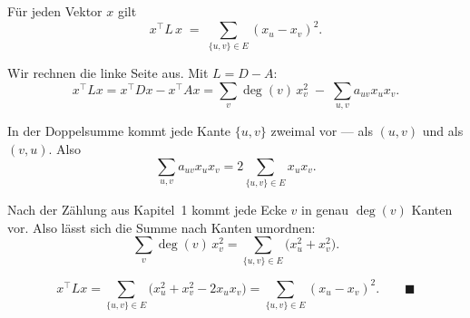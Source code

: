 \begin{merksatz}
Für jeden Vektor $x$ gilt
\[ x^{\!\top} L\, x \;=\; \sum_{\{u,v\} \in E} (x_u - x_v)^2 . \]

Wir rechnen die linke Seite aus. Mit $L = D - A$:
\[ x^{\!\top} L x = x^{\!\top} D x - x^{\!\top} A x = \sum_{v} \deg(v)\, x_v^2 \;-\; \sum_{u,v} a_{uv} x_u x_v . \]

 In der Doppelsumme kommt jede Kante $\{u,v\}$ zweimal vor --- als $(u,v)$ und als $(v,u)$. Also
\[ \sum_{u,v} a_{uv}x_ux_v = 2\sum_{\{u,v\}\in E} x_u x_v . \]

 Nach der Zählung aus Kapitel~1 kommt jede Ecke $v$ in genau $\deg(v)$ Kanten vor. Also lässt sich die Summe nach Kanten umordnen:
\[ \sum_v \deg(v)\,x_v^2 = \sum_{\{u,v\}\in E} \bigl(x_u^2 + x_v^2\bigr) . \]

\[ x^{\!\top}Lx = \sum_{\{u,v\}\in E}\bigl(x_u^2 + x_v^2 - 2x_ux_v\bigr) = \sum_{\{u,v\}\in E}(x_u - x_v)^2 . \qquad \blacksquare \]
\end{merksatz}

